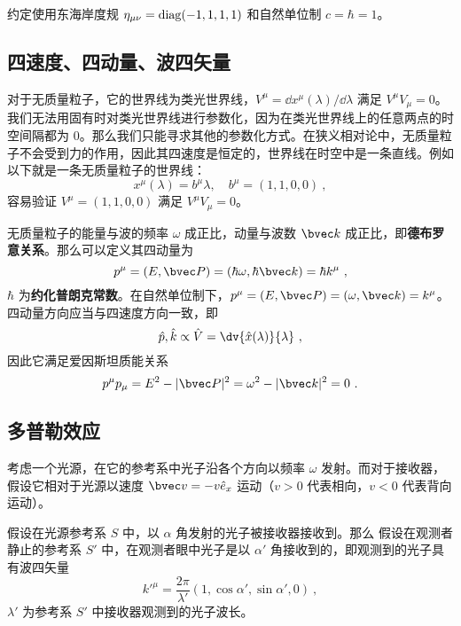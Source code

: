 

约定使用东海岸度规 $\eta_{\mu\nu}=\rm{diag}(-1,1,1,1)$ 和自然单位制 $c=\hbar=1$。
\subsection{四速度、四动量、波四矢量}
对于无质量粒子，它的世界线为类光世界线，$V^\mu=\dd x^\mu(\lambda)/\dd \lambda$ 满足 $V^\mu V_\mu = 0$。我们无法用固有时对类光世界线进行参数化，因为在类光世界线上的任意两点的时空间隔都为 $0$。那么我们只能寻求其他的参数化方式。在狭义相对论中，无质量粒子不会受到力的作用，因此其四速度是恒定的，世界线在时空中是一条直线。例如以下就是一条无质量粒子的世界线：
\begin{equation}
x^\mu(\lambda)=b^\mu \lambda,\quad b^\mu=(1,1,0,0)~,
\end{equation}
容易验证 $V^\mu=(1,1,0,0)$ 满足 $V^\mu V_\mu = 0$。

无质量粒子的能量与波的频率 $\omega$ 成正比，动量与波数 $\bvec k$ 成正比，即\textbf{德布罗意关系}。那么可以定义其四动量为
\begin{equation}
p^\mu=(E,\bvec P)=(\hbar \omega,\hbar \bvec k)=\hbar k^\mu~,
\end{equation}
$\hbar$ 为\textbf{约化普朗克常数}。在自然单位制下，$p^\mu=(E,\bvec P)=(\omega,\bvec k)=k^\mu$。四动量方向应当与四速度方向一致，即
\begin{equation}
\hat p,\hat k \propto \hat V=\dv{\hat x(\lambda)}{\lambda}~,
\end{equation}
因此它满足爱因斯坦质能关系
\begin{equation}
p^\mu p_\mu = E^2-|\bvec P|^2=\omega^2-|\bvec k|^2=0~.
\end{equation}
\subsection{多普勒效应}
考虑一个光源，在它的参考系中光子沿各个方向以频率 $\omega$ 发射。而对于接收器，假设它相对于光源以速度 $\bvec v=-v \hat e_x$ 运动（$v>0$ 代表相向，$v<0$ 代表背向运动）。

假设在光源参考系 $S$ 中，以 $\alpha$ 角发射的光子被接收器接收到。那么
假设在观测者静止的参考系 $S'$ 中，在观测者眼中光子是以 $\alpha'$ 角接收到的，即观测到的光子具有波四矢量
\begin{equation}
k'^\mu = \frac{2\pi}{\lambda'}(1,\cos\alpha',\sin\alpha',0)~,
\end{equation}
$\lambda'$ 为参考系 $S'$ 中接收器观测到的光子波长。

